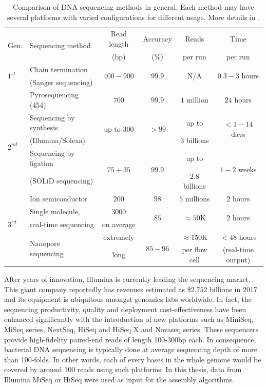 \begin{table}[ht!]
\centering
\caption[Comparison of DNA sequencing methods in general]{Comparison of DNA sequencing methods in general. Each method may have several platforms with varied configurations for different usage. More details in \cite{Lee2013common,Mardis2017dna}.} 
\label{tab:sequencing}
\begin{tabular}{l|l|c|c|c|c}
\hline
\multirow{2}{*}{Gen.} & \multirow{2}{*}{Sequencing method}& Read length & Accuracy & Reads  & Time \\
& & (bp) & (\%) & per run & per run \\\hline
\multirow{2}{*}{$1^{st}$} & Chain termination & \multirow{2}{*}{$400-900$} & \multirow{2}{*}{$99.9$} & \multirow{2}{*}{N/A} & \multirow{2}{*}{$0.3-3$ hours} \\
& (Sanger sequencing) & & & & \\\hline
\multirow{6}{*}{$2^{nd}$} & Pyrosequencing (454) & $700$ & $99.9$ & $1$ million & $24$ hours\\\cline{2-6}
& Sequencing by synthesis & \multirow{2}{*}{up to $300$} & \multirow{2}{*}{$>99$} & up to & \multirow{2}{*}{$<1-14$ days} \\
& (Illumina/Solexa) & & &  $3$ billions & \\\cline{2-6}
& Sequencing by ligation & \multirow{2}{*}{$75+35$} & \multirow{2}{*}{99.9} & up to & \multirow{2}{*}{$1-2$ weeks} \\
& (SOLiD sequencing) & & & $2.8$ billions & \\\cline{2-6}
& Ion semiconductor & $200$ & $98$ & $5$ millions & $2$ hours\\\hline
\multirow{3}{*}{$3^{rd}$} & Single molecule,  & $3000$ & \multirow{2}{*}{$85$} & \multirow{2}{*}{$\approx 50$K} & \multirow{2}{*}{$2$ hours} \\
& real-time sequencing &  on average & & & \\\cline{2-6}
& \multirow{2}{*}{Nanopore sequencing} & extremely & \multirow{2}{*}{$85-96$} & $\approx 150$K & $<48$ hours\\
& & long & & per flow cell & (real-time output) \\\hline
\end{tabular}
\end{table}  

After years of innovation, Illumina is currently leading the sequencing market. This giant company reportedly has revenues estimated as \$$2.752$ billions in 2017 and its equipment is ubiquitous amongst genomics labs worldwide. 
In fact, the sequencing productivity, quality and deployment cost-effectiveness have been enhanced significantly with the introduction of new platforms such as MiniSeq, MiSeq series, NextSeq, HiSeq and HiSeq X and Novaseq series. These sequencers provide high-fidelity paired-end reads of length 100-300bp each.  In consequence, bacterial DNA sequencing is typically done at average sequencing depth of more than 100-folds.
In other words, each of every bases in the whole genome would be covered by around 100 reads using such platforms.
In this thesis, data from Illumina MiSeq or HiSeq were used as input for the assembly algorithms. 

